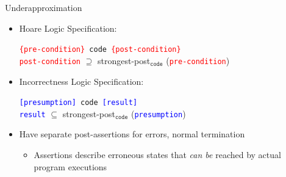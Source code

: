 \documentclass[
  10pt,
  ignorenonframetext,
]{beamer}
\providecommand{\tightlist}{%
  \setlength{\itemsep}{0pt}\setlength{\parskip}{0pt}}
\begin{document}
\begin{frame}{Underapproximation}
\label{underapproximation}
\begin{itemize}
\tightlist
\item
  Hoare Logic Specification:

  \begin{center}
    \texttt{\textcolor{red}{\{pre-condition\}} code \textcolor{red}{\{post-condition\}}} \\
    \texttt{\textcolor{red}{post-condition}} $\supseteq$ strongest-post$_{\texttt{code}}$ (\texttt{\textcolor{red}{pre-condition}})
    \end{center}
\item
  Incorrectness Logic Specification:

  \begin{center}
    \texttt{\textcolor{blue}{[presumption]} code \textcolor{blue}{[result]}} \\
    \texttt{\textcolor{blue}{result}} $\subseteq$ strongest-post$_{\texttt{code}}$ (\texttt{\textcolor{blue}{presumption}})
    \end{center}
\item
  Have separate post-assertions for errors, normal termination

  \begin{itemize}
  \tightlist
  \item
    Assertions describe erroneous states that \emph{can be} reached by
    actual program executions
  \end{itemize}
\end{itemize}
\end{frame}
\end{document}
